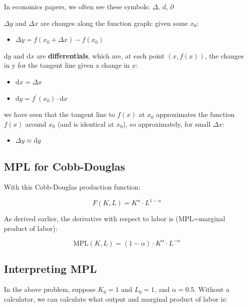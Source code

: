 \documentclass[
]{book}
\providecommand{\tightlist}{%
  \setlength{\itemsep}{0pt}\setlength{\parskip}{0pt}}
\begin{document}
In economics papers, we often see these symbols: \(\Delta\), \(d\),
\(\partial\)

\(\Delta y\) and \(\Delta x\) are changes along the function graph: given
some \(x_0\):

\begin{itemize}
\tightlist
\item
  \(\displaystyle \Delta y=f(x_0 +\Delta x)-f(x_0 )\)
\end{itemize}

\(\textrm{d}y\) and \(\textrm{d}x\) are \textbf{differentials}, which are, at
each point \((x,f(x))\), the changes in y for the tangent line given a
change in \(x\):

\begin{itemize}
\item
  \(\displaystyle \textrm{d}x=\Delta x\)
\item
  \(\displaystyle \textrm{d}y=f^{\prime } (x_0 )\cdot \textrm{d}x\)
\end{itemize}

we have seen that the tangent line to \(f(x)\) at \(x_0\) approximates the
function \(f(x)\) around \(x_0\) (and is identical at \(x_0\)), so
approximately, for small \(\Delta x\):

\begin{itemize}
\tightlist
\item
  \(\displaystyle \Delta y\approx \textrm{d}y\)
\end{itemize}

\hypertarget{mpl-for-cobb-douglas}{%
\subsection{MPL for Cobb-Douglas}\label{mpl-for-cobb-douglas}}

With this Cobb-Douglas production function:

\[F(K,L)=K^{\alpha } \cdot L^{1-\alpha }\]

As derived earlier, the derivative with respect to labor is
(MPL=marginal product of labor):

\[\textrm{MPL}(K,L)=(1-\alpha )\cdot K^{\alpha } \cdot L^{-\alpha }\]

\hypertarget{interpreting-mpl}{%
\subsection{Interpreting MPL}\label{interpreting-mpl}}

In the above problem, suppose \(K_0 =1\) and \(L_0 =1\), and \(\alpha =0.5\).
Without a calculator, we can calculate what output and marginal product
of labor is:
\end{document}
